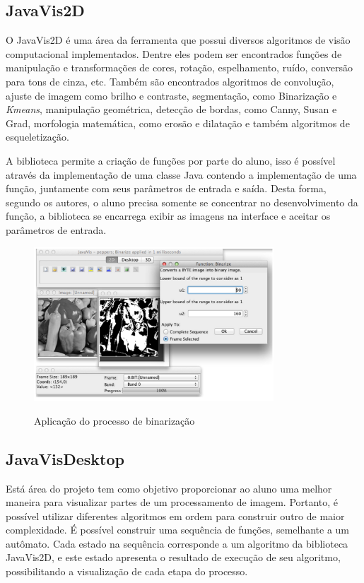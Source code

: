 \documentclass[
	12pt,				%
	oneside,			%
	a4paper,			%
	english,			%
	french,				%
	spanish,			%
	brazil,				%
	]{abntex2}
\begin{document}
\subsection{JavaVis2D}

O JavaVis2D é uma área da ferramenta que possui diversos algoritmos de visão computacional implementados. Dentre eles podem ser encontrados funções de manipulação e transformações de cores,  rotação, espelhamento, ruído, conversão para tons de cinza, etc. Também são encontrados algoritmos de convolução, ajuste de imagem como brilho e contraste, segmentação, como Binarização e \textit{Kmeans}, manipulação geométrica, detecção de bordas, como Canny, Susan e Grad, morfologia matemática, como erosão e dilatação e também algoritmos de esqueletização. 

A biblioteca permite a criação de funções por parte do aluno, isso é possível através da implementação de uma classe Java contendo a implementação de uma função, juntamente com seus parâmetros de entrada e saída. Desta forma, segundo os autores, o aluno precisa somente se concentrar no desenvolvimento da função, a biblioteca se encarrega exibir as imagens na interface e aceitar os parâmetros de entrada.

\begin{figure}[ht]
\centering
\caption{Aplicação do processo de binarização }
\includegraphics[width=0.8\textwidth]{imagens/javavis_2d.png}
\label{fig:javavis_2d}
\end{figure}

\subsection{JavaVisDesktop}

Está área do projeto tem como objetivo proporcionar ao aluno uma melhor maneira para visualizar partes de um processamento de imagem. Portanto, é possível utilizar diferentes algoritmos em ordem para construir outro de maior complexidade. É possível construir uma sequência de funções, semelhante a um autômato. Cada estado na sequência corresponde a um algoritmo da biblioteca JavaVis2D, e este estado apresenta o resultado de execução de seu algoritmo, possibilitando a visualização de cada etapa do processo.
\end{document}
